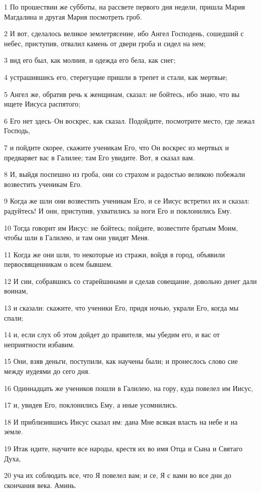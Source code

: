\par 1 По прошествии же субботы, на рассвете первого дня недели, пришла Мария Магдалина и другая Мария посмотреть гроб.
\par 2 И вот, сделалось великое землетрясение, ибо Ангел Господень, сошедший с небес, приступив, отвалил камень от двери гроба и сидел на нем;
\par 3 вид его был, как молния, и одежда его бела, как снег;
\par 4 устрашившись его, стерегущие пришли в трепет и стали, как мертвые;
\par 5 Ангел же, обратив речь к женщинам, сказал: не бойтесь, ибо знаю, что вы ищете Иисуса распятого;
\par 6 Его нет здесь--Он воскрес, как сказал. Подойдите, посмотрите место, где лежал Господь,
\par 7 и пойдите скорее, скажите ученикам Его, что Он воскрес из мертвых и предваряет вас в Галилее; там Его увидите. Вот, я сказал вам.
\par 8 И, выйдя поспешно из гроба, они со страхом и радостью великою побежали возвестить ученикам Его.
\par 9 Когда же шли они возвестить ученикам Его, и се Иисус встретил их и сказал: радуйтесь! И они, приступив, ухватились за ноги Его и поклонились Ему.
\par 10 Тогда говорит им Иисус: не бойтесь; пойдите, возвестите братьям Моим, чтобы шли в Галилею, и там они увидят Меня.
\par 11 Когда же они шли, то некоторые из стражи, войдя в город, объявили первосвященникам о всем бывшем.
\par 12 И сии, собравшись со старейшинами и сделав совещание, довольно денег дали воинам,
\par 13 и сказали: скажите, что ученики Его, придя ночью, украли Его, когда мы спали;
\par 14 и, если слух об этом дойдет до правителя, мы убедим его, и вас от неприятности избавим.
\par 15 Они, взяв деньги, поступили, как научены были; и пронеслось слово сие между иудеями до сего дня.
\par 16 Одиннадцать же учеников пошли в Галилею, на гору, куда повелел им Иисус,
\par 17 и, увидев Его, поклонились Ему, а иные усомнились.
\par 18 И приблизившись Иисус сказал им: дана Мне всякая власть на небе и на земле.
\par 19 Итак идите, научите все народы, крестя их во имя Отца и Сына и Святаго Духа,
\par 20 уча их соблюдать все, что Я повелел вам; и се, Я с вами во все дни до скончания века. Аминь.


